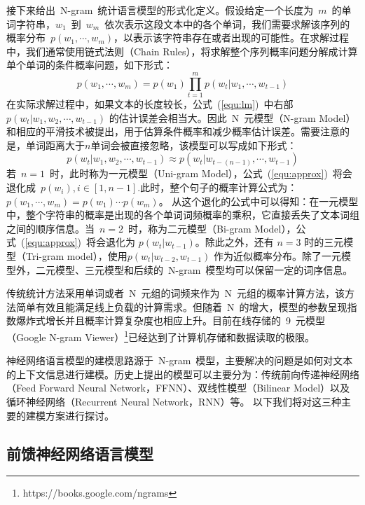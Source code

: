 接下来给出~N-gram~统计语言模型的形式化定义。假设给定一个长度为~$m$~的单词字符串，$w_1$~到~$w_m$~依次表示这段文本中的各个单词，我们需要求解该序列的概率分布~$p(w_1,\cdots,w_m)$，以表示该字符串存在或者出现的可能性。在求解过程中，我们通常使用链式法则（Chain Rules），将求解整个序列概率问题分解成计算单个单词的条件概率问题，如下形式：
\begin{equation}
\label{equ:lm}
p(w_1,\cdots,w_m) =p(w_1)\prod_{t=1}^{m}p(w_t|w_1,\cdots,w_{t-1})
\end{equation}
在实际求解过程中，如果文本的长度较长，公式~(\ref{equ:lm})~中右部~$p(w_t | w_1,w_2,\cdots,w_{t-1}) $ 的估计误差会相当大。因此~N~元模型（N-gram Model）和相应的平滑技术被提出，用于估算条件概率和减少概率估计误差。需要注意的是，单词距离大于$n$单词会被直接忽略，该模型可以写成如下形式：
\begin{equation}
\label{equ:approx}
p(w_t | w_1,w_2,\cdots,w_{t-1})  \approx p(w_t | w_{t-(n-1)},\cdots,w_{t-1})
\end{equation}
若~$n=1$~时，此时称为一元模型（Uni-gram Model），公式~(\ref{equ:approx})~将会退化成~$p(w_i),i\in [1,n-1]$.此时，整个句子的概率计算公式为：~$p(w_1,\cdots,w_m) = p(w_1)\cdots p(w_m)$。
从这个退化的公式中可以得知：在一元模型中，整个字符串的概率是出现的各个单词词频概率的乘积，它直接丢失了文本词组之间的顺序信息。当~$n = 2$~时，称为二元模型（Bi-gram Model），公式~(\ref{equ:approx})~将会退化为 $p(w_t|w_{t-1})$。除此之外，还有 $n=3$ 时的三元模型（Tri-gram model），使用$p(w_t |w_{t-2},w_{t-1})$ 作为近似概率分布。除了一元模型外，二元模型、三元模型和后续的~N-gram~模型均可以保留一定的词序信息。

传统统计方法采用单词或者~N~元组的词频来作为~N~元组的概率计算方法，该方法简单有效且能满足线上负载的计算需求。但随着~N~的增大，模型的参数呈现指数爆炸式增长并且概率计算复杂度也相应上升。目前在线存储的~9~元模型（Google N-gram Viewer）\footnote{https://books.google.com/ngrams}已经达到了计算机存储和数据读取的极限。


神经网络语言模型的建模思路源于~N-gram~模型，主要解决的问题是如何对文本的上下文信息进行建模。历史上提出的模型可以主要分为：传统前向传递神经网络（Feed Forward Neural Network，FFNN）、双线性模型（Bilinear Model）以及循环神经网络（Recurrent Neural Network，RNN）等。 以下我们将对这三种主要的建模方案进行探讨。


\subsection{前馈神经网络语言模型}

